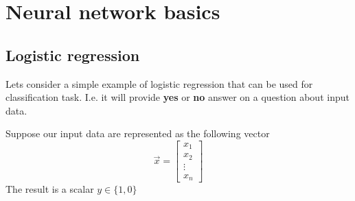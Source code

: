 \chapter{Neural network basics}

\section{Logistic regression}
Lets consider a simple example of logistic regression that can be used for
classification task. I.e. it will provide \textbf{yes} or \textbf{no} answer on
a question about input data.

Suppose our input data are represented as the following vector
\[
\vec{x} =
\begin{bmatrix}
  x_{1} \\
  x_{2} \\
  \vdots \\
  x_{n}
\end{bmatrix}
\]
The result is a scalar $y \in \{1,0\}$

